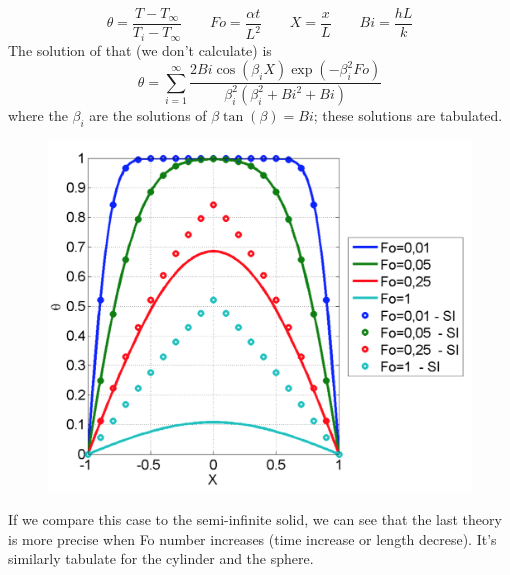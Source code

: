 	 	\begin{equation}
	 		\theta = \frac{T-T_\infty}{T_i-T_\infty} \qquad Fo = \frac{\alpha t}{L^2} \qquad X = \frac{x}{L} \qquad Bi = \frac{hL}{k}
	 	\end{equation}
	 	The solution of that (we don't calculate) is 
	 	\begin{equation}
	 		\theta = \sum _{i=1}^\infty \frac{2Bi \cos (\beta _i X)\exp (-\beta _i^2 Fo)}{\beta _i^2 (\beta _i^2 + Bi^2+Bi)}
	 	\end{equation}
	 	where the $\beta _i$ are the solutions of $\beta \tan (\beta ) = Bi$; these solutions are tabulated. 
	 	
		\begin{figure}
		\vspace{-5mm}
		\includegraphics[scale=0.2]{ch4/8}
		\end{figure}	
	 	If we compare this case to the semi-infinite solid, we can see that the last theory is more precise when Fo number increases (time increase or length decrese).  It's similarly tabulate for the cylinder and the sphere. 